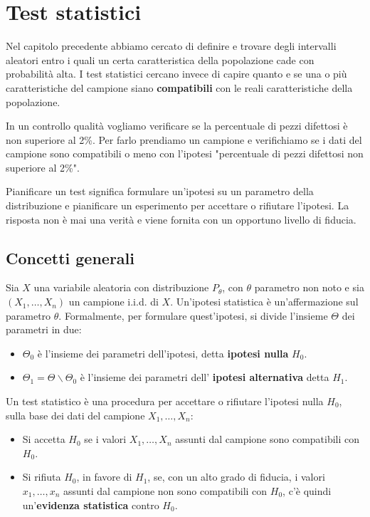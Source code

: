 \chapter{Test statistici}
Nel capitolo precedente abbiamo cercato di definire e trovare degli intervalli aleatori entro i
quali un certa caratteristica della popolazione cade con probabilità alta. I test statistici
cercano invece di capire quanto e se una o più caratteristiche del campione siano
\textbf{compatibili} con le reali caratteristiche della popolazione.

In un controllo qualità vogliamo verificare se la percentuale di pezzi difettosi è non superiore
al 2\%. Per farlo prendiamo un campione e verifichiamo se i dati del campione sono compatibili o
meno con l'ipotesi "percentuale di pezzi difettosi non superiore al 2\%".

Pianificare un test significa formulare un'ipotesi su un parametro della distribuzione e
pianificare un esperimento per accettare o rifiutare l'ipotesi. La risposta non è mai una verità
e viene fornita con un opportuno livello di fiducia.

\section{Concetti generali}
Sia $X$ una variabile aleatoria con distribuzione $P_\theta$, con $\theta$ parametro non noto e
sia $(X_1, \dots, X_n)$ un campione i.i.d. di $X$. Un'ipotesi statistica è un'affermazione sul
parametro $\theta$. Formalmente, per formulare quest'ipotesi, si divide l'insieme $\Theta$ dei
parametri in due:
\begin{itemize}
	\item $\Theta_0$ è l'insieme dei parametri dell'ipotesi, detta \textbf{ipotesi nulla} $H_0$.
	\item $\Theta_1 = \Theta \backslash \Theta_0$ è l'insieme dei parametri dell'
	      \textbf{ipotesi alternativa} detta $H_1$.
\end{itemize}
Un test statistico è una procedura per accettare o rifiutare l'ipotesi nulla $H_0$, sulla base dei
dati del campione $X_1, \dots, X_n$:
\begin{itemize}
	\item Si accetta $H_0$ se i valori $X_1, \dots, X_n$ assunti dal campione sono compatibili con
	      $H_0$.
	\item Si rifiuta $H_0$, in favore di $H_1$, se, con un alto grado di fiducia, i valori
	      $x_1, \dots, x_n$ assunti dal campione non sono compatibili con $H_0$, c'è quindi
	      un'\textbf{evidenza statistica} contro $H_0$.
\end{itemize}

